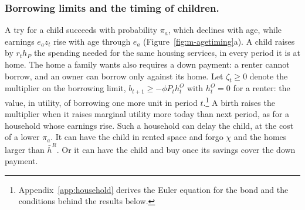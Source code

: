 \subsubsection*{Borrowing limits and the timing of children.}
A try for a child succeeds with probability $\pi_a$, which declines with age,
while earnings $e_az_t$ rise with age through $e_a$
(Figure~\ref{fig:m-agetiming}a). A child raises by $r_th_P$ the spending
needed for the same housing services, in every period it is at home. The home
a family wants also requires a down payment: a renter cannot borrow, and an
owner can borrow only against its home. Let $\zeta_t\ge0$ denote the
multiplier on the borrowing limit, $b_{t+1}\ge-\phi P_th^O_t$ with $h^O_t=0$
for a renter: the value, in utility, of borrowing one more unit in period
$t$.\footnote{Appendix~\ref{app:household} derives the Euler equation for the
bond and the conditions behind the results below.} A birth raises the
multiplier when it raises marginal utility more today than next period, as
for a household whose earnings rise. Such a household can delay the child, at
the cost of a lower $\pi_a$. It can have the child in rented space and forgo
$\chi$ and the homes larger than $\bar h^R$. Or it can have the child and buy
once its savings cover the down payment.


